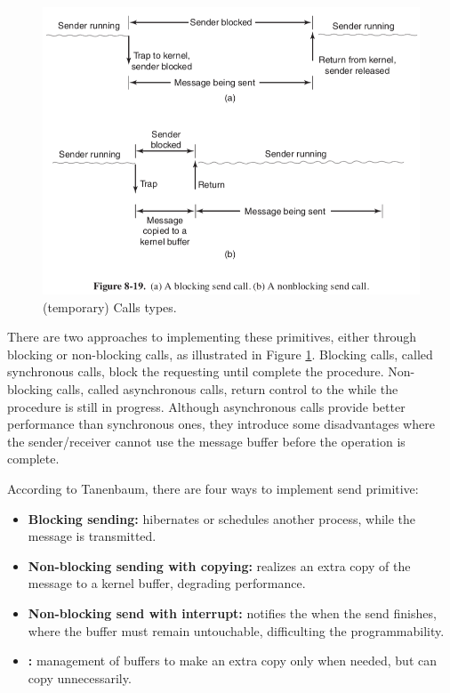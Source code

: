 				\begin{figure}[h]
					\centering
					\includegraphics[width=.8\textwidth]{images/calls-types.png}

					\caption{
						(temporary) Calls types.
					}\par
					\label{fig.calls_types}
				\end{figure}

				There are two approaches to implementing these primitives, either
				through blocking or non-blocking calls, as illustrated in Figure \ref{fig.calls_types}.
				Blocking calls, called synchronous calls, block the requesting \cpu
				until complete the procedure.
				Non-blocking calls, called asynchronous calls, return control to the
				\cpu while the procedure is still in progress.
				Although asynchronous calls provide better performance than
				synchronous ones, they introduce some disadvantages where the sender/receiver
				cannot use the message buffer before the operation is complete.

				According to Tanenbaum, there are four ways to implement send primitive:
				\begin{itemize}
					\item \textbf{Blocking sending:} \cpu hibernates or schedules another
						process, while the message is transmitted.
					\item \textbf{Non-blocking sending with copying:} realizes an extra copy of
						the message to a kernel buffer, degrading performance.
					\item \textbf{Non-blocking send with interrupt:} notifies the \cpu
						when the send finishes, where the buffer must remain untouchable,
						difficulting the programmability.
					\item \textbf{\cow:} management of buffers to make an extra copy only
						when needed, but can copy unnecessarily.
				\end{itemize}

